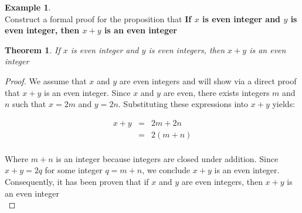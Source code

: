 \documentclass{book}
\newtheorem{theorem}{Theorem}[section]
\theoremstyle{definition}
\newtheorem{example}{Example}[definition]
\theoremstyle{remark}
\begin{document}
\begin{example}
\cite[Chap.1, P.C.1.9, Q.1]{ted} \\
Construct a formal proof for the proposition that {\bf If $x$ is even integer and $y$ is even integer, then $x + y$ is an even integer} \\

\begin{tcolorbox}
    \begin{theorem}
        If $x$ is even integer and $y$ is even integers, then $x + y$ is an even integer
    \end{theorem}
\end{tcolorbox}

\begin{proof}
    We assume that $x$ and $y$ are even integers and will show via a direct proof that $x + y$ is an even integer. Since $x$ and $y$ are even, there exists integers $m$ and $n$ such that $x = 2m$ and $y = 2n$. Substituting these expressions into $x + y$ yields:
    
    \begin{eqnarray*}
        x + y & = & 2m + 2n \nonumber \\
        & = & 2(m + n) \nonumber \\
    \end{eqnarray*}
    
    Where $m + n$ is an integer because integers are closed under addition. Since $x + y = 2q$ for some integer $q = m + n$, we conclude $x + y$ is an even integer. Consequently, it has been proven that if $x$ and $y$ are even integers, then $x + y$ is an even integer \\
\end{proof}
\end{example}
\end{document}
